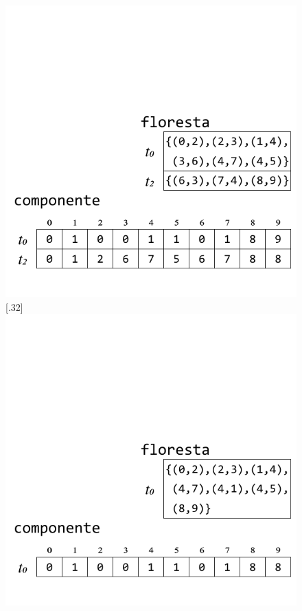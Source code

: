 \documentclass[12pt]{article}
\begin{document}
\begin{figure}[h]
{		\includegraphics[width=\linewidth]{E.pdf}
	}
	\subcaptionbox{}[.32\textwidth]
	{
		\includegraphics[width=\linewidth]{F.pdf}
	}
\end{figure}
\end{document}
